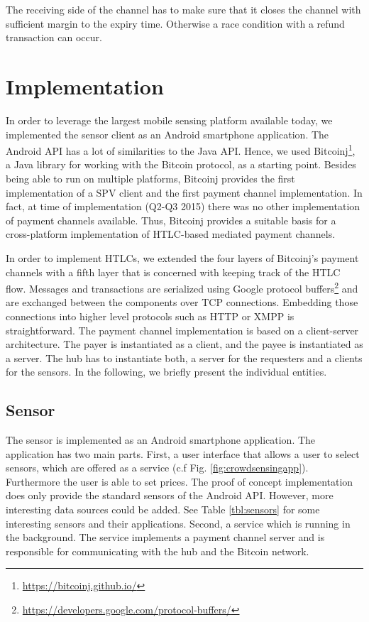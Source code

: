  The receiving side of the channel has to make sure that it closes the channel with sufficient margin to the expiry time. Otherwise a race condition with a refund transaction can occur.

\section{Implementation}
\label{sec:trust-lessimplementation}

In order to leverage the largest mobile sensing platform available today, we implemented the sensor client as an Android smartphone application. The Android \ac{API} has a lot of similarities to the Java \ac{API}. Hence, we used Bitcoinj\footnote{\url{https://bitcoinj.github.io/}}, a Java library for working with the Bitcoin protocol, as a starting point. Besides being able to run on multiple platforms, Bitcoinj provides the first implementation of a \ac{SPV} client and the first payment channel implementation. In fact, at time of implementation (Q2-Q3 2015) there was no other implementation of payment channels available. Thus, Bitcoinj provides a suitable basis for a cross-platform implementation of \ac{HTLC}-based mediated payment channels.

In order to implement \ac{HTLC}s, we extended the four layers of Bitcoinj's payment channels with a fifth layer that is concerned with keeping track of the \ac{HTLC} flow.
Messages and transactions are serialized using Google protocol buffers\footnote{\url{https://developers.google.com/protocol-buffers/}} and are exchanged between the components over \ac{TCP} connections. Embedding those connections into higher level protocols such as \ac{HTTP} or \ac{XMPP} is straightforward.
The payment channel implementation is based on a client-server architecture. The payer is instantiated as a client, and the payee is instantiated as a server. The hub has to instantiate both, a server for the requesters and a clients for the sensors. In the following, we briefly present the individual entities. 

\subsection{Sensor}
The sensor is implemented as an Android smartphone application. The application has two main parts. First, a user interface that allows a user to select sensors, which are offered as a service (c.f Fig. \ref{fig:crowdsensingapp}). Furthermore the user is able to set prices. The proof of concept implementation does only provide the standard sensors of the Android \ac{API}. However, more interesting data sources could be added. See Table \ref{tbl:sensors} for some interesting sensors and their applications. Second, a service which is running in the background. The service implements a payment channel server and is responsible for communicating with the hub and the Bitcoin network. 


